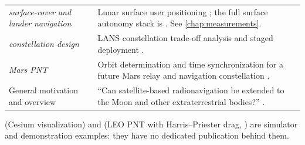 \begin{table}[H]
\begin{tabularx}{\textwidth}{@{}>{\raggedright\arraybackslash}p{}L@{}}
      \emph{surface-rover and lander navigation} &
      Lunar surface user positioning
      \citep{iiyama2023tdcp, coimbra2025endurance}; the full surface autonomy
      stack is \citep{dai2025fullstack, dai2025iongnss}. See
      \cref{chap:measurements}. \\
    \addlinespace
     \newline
      \emph{constellation design} &
      LANS constellation trade-off analysis and staged deployment
      \citep{iiyama2025constellation}. \\
    \addlinespace
     \newline
      \emph{Mars PNT} &
      Orbit determination and time synchronization for a future Mars relay and
      navigation constellation \citep{iiyama2025mars}. \\
    \addlinespace
    General motivation and overview &
      ``Can satellite-based radionavigation be extended to the Moon and other
      extraterrestrial bodies?'' \citep{iiyama2025insidegnss}. \\
    \bottomrule
  \end{tabularx}
\end{table}

\begin{lupntnote}
 (Cesium visualization) and  (LEO PNT with
Harris--Priester drag, \citep{harris1962priester}) are simulator and
demonstration examples: they have no dedicated publication behind them.
\end{lupntnote}
